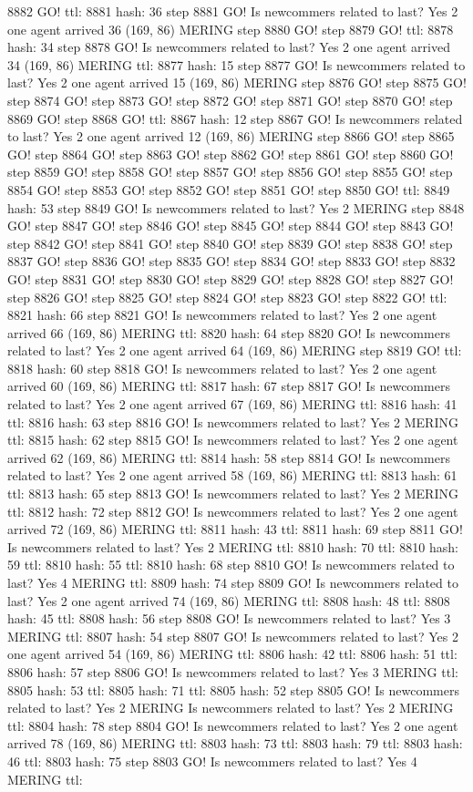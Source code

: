 8882 GO! ttl: 8881 hash: 36 step 8881 GO! Is newcommers related to last? Yes 2 one agent arrived 36 (169, 86) MERING step 8880 GO! step 8879 GO! ttl: 8878 hash: 34 step 8878 GO! Is newcommers related to last? Yes 2 one agent arrived 34 (169, 86) MERING ttl: 8877 hash: 15 step 8877 GO! Is newcommers related to last? Yes 2 one agent arrived 15 (169, 86) MERING step 8876 GO! step 8875 GO! step 8874 GO! step 8873 GO! step 8872 GO! step 8871 GO! step 8870 GO! step 8869 GO! step 8868 GO! ttl: 8867 hash: 12 step 8867 GO! Is newcommers related to last? Yes 2 one agent arrived 12 (169, 86) MERING step 8866 GO! step 8865 GO! step 8864 GO! step 8863 GO! step 8862 GO! step 8861 GO! step 8860 GO! step 8859 GO! step 8858 GO! step 8857 GO! step 8856 GO! step 8855 GO! step 8854 GO! step 8853 GO! step 8852 GO! step 8851 GO! step 8850 GO! ttl: 8849 hash: 53 step 8849 GO! Is newcommers related to last? Yes 2 MERING step 8848 GO! step 8847 GO! step 8846 GO! step 8845 GO! step 8844 GO! step 8843 GO! step 8842 GO! step 8841 GO! step 8840 GO! step 8839 GO! step 8838 GO! step 8837 GO! step 8836 GO! step 8835 GO! step 8834 GO! step 8833 GO! step 8832 GO! step 8831 GO! step 8830 GO! step 8829 GO! step 8828 GO! step 8827 GO! step 8826 GO! step 8825 GO! step 8824 GO! step 8823 GO! step 8822 GO! ttl: 8821 hash: 66 step 8821 GO! Is newcommers related to last? Yes 2 one agent arrived 66 (169, 86) MERING ttl: 8820 hash: 64 step 8820 GO! Is newcommers related to last? Yes 2 one agent arrived 64 (169, 86) MERING step 8819 GO! ttl: 8818 hash: 60 step 8818 GO! Is newcommers related to last? Yes 2 one agent arrived 60 (169, 86) MERING ttl: 8817 hash: 67 step 8817 GO! Is newcommers related to last? Yes 2 one agent arrived 67 (169, 86) MERING ttl: 8816 hash: 41 ttl: 8816 hash: 63 step 8816 GO! Is newcommers related to last? Yes 2 MERING ttl: 8815 hash: 62 step 8815 GO! Is newcommers related to last? Yes 2 one agent arrived 62 (169, 86) MERING ttl: 8814 hash: 58 step 8814 GO! Is newcommers related to last? Yes 2 one agent arrived 58 (169, 86) MERING ttl: 8813 hash: 61 ttl: 8813 hash: 65 step 8813 GO! Is newcommers related to last? Yes 2 MERING ttl: 8812 hash: 72 step 8812 GO! Is newcommers related to last? Yes 2 one agent arrived 72 (169, 86) MERING ttl: 8811 hash: 43 ttl: 8811 hash: 69 step 8811 GO! Is newcommers related to last? Yes 2 MERING ttl: 8810 hash: 70 ttl: 8810 hash: 59 ttl: 8810 hash: 55 ttl: 8810 hash: 68 step 8810 GO! Is newcommers related to last? Yes 4 MERING ttl: 8809 hash: 74 step 8809 GO! Is newcommers related to last? Yes 2 one agent arrived 74 (169, 86) MERING ttl: 8808 hash: 48 ttl: 8808 hash: 45 ttl: 8808 hash: 56 step 8808 GO! Is newcommers related to last? Yes 3 MERING ttl: 8807 hash: 54 step 8807 GO! Is newcommers related to last? Yes 2 one agent arrived 54 (169, 86) MERING ttl: 8806 hash: 42 ttl: 8806 hash: 51 ttl: 8806 hash: 57 step 8806 GO! Is newcommers related to last? Yes 3 MERING ttl: 8805 hash: 53 ttl: 8805 hash: 71 ttl: 8805 hash: 52 step 8805 GO! Is newcommers related to last? Yes 2 MERING Is newcommers related to last? Yes 2 MERING ttl: 8804 hash: 78 step 8804 GO! Is newcommers related to last? Yes 2 one agent arrived 78 (169, 86) MERING ttl: 8803 hash: 73 ttl: 8803 hash: 79 ttl: 8803 hash: 46 ttl: 8803 hash: 75 step 8803 GO! Is newcommers related to last? Yes 4 MERING ttl: 